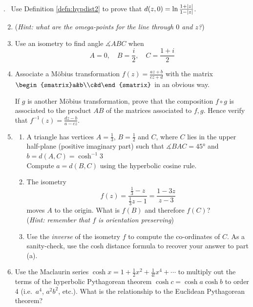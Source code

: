 \begin{exercises}
\hangindent{}. \ Use Definition \ref{defn:hypdist2} to prove that $d(z,0)=\ln\frac{1+\left| z\right|}{1-\left| z\right|}$.
\begin{enumerate}\setcounter{enumi}{1}
  \item[](\emph{Hint: what are the omega-points for the line through $0$ and $z$?})
  
  \item Use an isometry to find angle $\measuredangle ABC$ when
  \[A=0,\quad B=\frac i2,\quad C=\frac{1+i}2\]

  \item Associate a Möbius transformation $f(z)=\frac{az+b}{cz+d}$ with the matrix $\begin{smatrix}a&b\\c&d\end{smatrix}$ in an obvious way.\par
  If $g$ is another Möbius transformation, prove that the composition $f\circ g$ is associated to the product $AB$ of the matrices associated to $f,g$. 
  Hence verify\footnotemark{} that $f^{-1}(z)=\frac{dz-b}{a-cz}$.
  
  \item\begin{enumerate}
    \item A triangle has vertices $A=\frac 13$, $B=\frac 12$ and $C$, where $C$ lies in the upper half-plane (positive imaginary part) such that $\measuredangle{BAC}=\ang{45}$ and $b=d(A,C)=\cosh^{-1}3$\\[2pt]
    Compute $a=d(B,C)$ using the hyperbolic cosine rule.
    
    \item The isometry
    \[f(z)=\frac{\frac 13-z}{\frac 13z-1}=\frac{1-3z}{z-3}\]
    moves $A$ to the origin. What is $f(B)$ and therefore $f(C)$?\\
    (\emph{Hint: remember that $f$ is orientation preserving})
    
    \item Use the \emph{inverse} of the isometry $f$ to compute the co-ordinates of $C$. As a sanity-check, use the cosh distance formula to recover your answer to part (a).    
  \end{enumerate}
  
	\item Use the Maclaurin series $\cosh x=1+\frac 12x^2+\frac 1{4!}x^4+\cdots$ to multiply out the terms of the hyperbolic Pythagorean theorem $\cosh c=\cosh a\cosh b$ to order 4 (i.e.\ $a^4$, $a^2b^2$, etc.). What is the relationship to the Euclidean Pythagorean theorem?


\end{enumerate}
\end{exercises}
